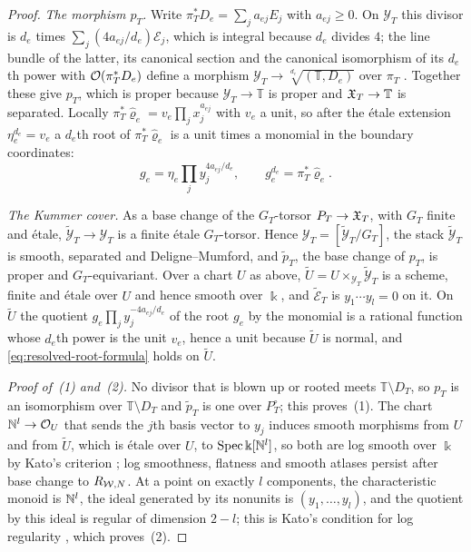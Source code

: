 \begin{proof}
\emph{The morphism $p_T$.}  Write $\pi_T^*D_e=\sum_ja_{ej}E_j$
with $a_{ej}\geq0$.  On $\mathcal Y_T$ this divisor is $d_e$
times $\sum_j(4a_{ej}/d_e)\mathcal E_j$, which is integral
because $d_e$ divides $4$; the line bundle of the latter, its
canonical section and the canonical isomorphism of its $d_e$th power
with $\mathcal O(\pi_T^*D_e)$ define a morphism
$\mathcal Y_T\to\sqrt[d_e]{(\mathbb T,D_e)}$ over $\pi_T$
\cite[Defs.~2.1, 2.3]{cadman2007}.  Together these give $p_T$, which is
proper because $\mathcal Y_T\to\mathbb T$ is proper and $\mathfrak X_T\to\mathbb T$ is
separated.  Locally $\pi_T^*\widehat\varrho_e=v_e\prod_jx_j^{a_{ej}}$
with $v_e$ a unit, so after the \'etale extension
$\eta_e^{d_e}=v_e$ a $d_e$th root of
$\pi_T^*\widehat\varrho_e$ is a unit times a monomial in the boundary
coordinates:
\begin{equation}\label{eq:resolved-root-formula}
 g_e=\eta_e
 \prod_{j}y_j^{4a_{ej}/d_e},
 \qquad
 g_e^{d_e}=\pi_T^*\widehat\varrho_e .
\end{equation}

\emph{The Kummer cover.}  As a base change of the $G_T$-torsor
$P_T\to\mathfrak X_T$, with $G_T$ finite and \'etale,
$\widetilde{\mathcal Y}_T\to\mathcal Y_T$ is a finite \'etale $G_T$-torsor.
Hence $\mathcal Y_T=[\widetilde{\mathcal Y}_T/G_T]$, the stack
$\widetilde{\mathcal Y}_T$ is smooth, separated and Deligne--Mumford, and
$\widetilde p_T$, the base change of $p_T$, is proper and
$G_T$-equivariant.  Over a chart $U$ as above,
$\widetilde U=U\times_{\mathcal Y_T}\widetilde{\mathcal Y}_T$ is a scheme,
finite and \'etale over $U$ and hence smooth over $\Bbbk$, and
$\widetilde{\mathcal E}_T$ is $y_1\cdots y_l=0$ on it.  On $\widetilde U$
the quotient $g_e\prod_jy_j^{-4a_{ej}/d_e}$ of the root
$g_e$ by the monomial is a rational function whose $d_e$th power
is the unit $v_e$, hence a unit because $\widetilde U$ is normal, and
\eqref{eq:resolved-root-formula} holds on $\widetilde U$.

\emph{Proof of~(1) and~(2).}  No divisor that is blown up or rooted meets
$\mathbb T\setminus D_T$, so $p_T$ is an isomorphism over $\mathbb T\setminus D_T$
and $\widetilde p_T$ is one over $P_T^\circ$; this proves~(1).  The chart
$\mathbb N^l\to\mathcal O_U$ that sends the $j$th basis vector to $y_j$ induces smooth
morphisms from $U$ and from $\widetilde U$, which is \'etale over $U$, to
$\operatorname{Spec}\Bbbk[\mathbb N^l]$, so both are log smooth over $\Bbbk$ by Kato's criterion
\cite[Thm.~3.5]{kato1989log}; log smoothness, flatness and smooth atlases
persist after base change to $R_{\mathcal W,N}$.  At a point on exactly $l$
components, the characteristic monoid is $\mathbb N^l$, the ideal generated by
its nonunits is $(y_1,\ldots,y_l)$, and the quotient by this ideal is
regular of dimension $2-l$; this is Kato's condition for log regularity
\cite[Def.~2.1]{kato1994toric}, which proves~(2).


\end{proof}
